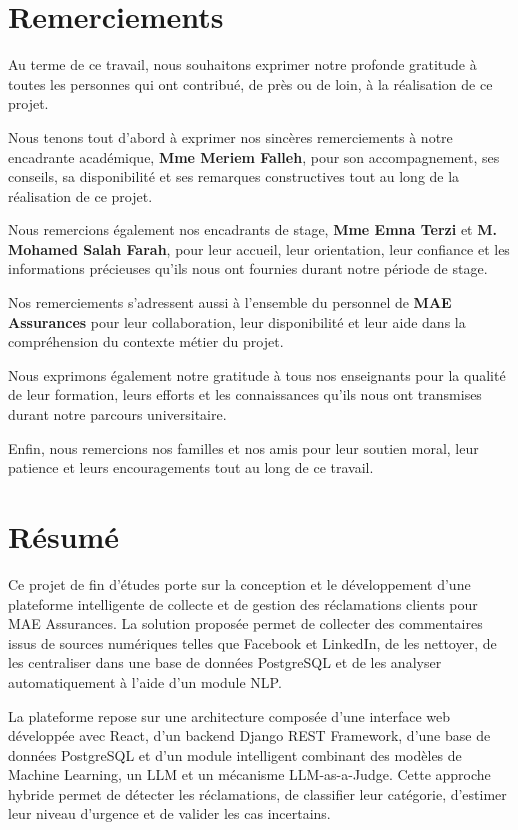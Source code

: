 \documentclass[12pt,a4paper,oneside]{report}
\begin{document}
\chapter*{Remerciements}

Au terme de ce travail, nous souhaitons exprimer notre profonde gratitude à toutes les personnes qui ont contribué, de près ou de loin, à la réalisation de ce projet.

Nous tenons tout d’abord à exprimer nos sincères remerciements à notre encadrante académique, \textbf{Mme Meriem Falleh}, pour son accompagnement, ses conseils, sa disponibilité et ses remarques constructives tout au long de la réalisation de ce projet.

Nous remercions également nos encadrants de stage, \textbf{Mme Emna Terzi} et \textbf{M. Mohamed Salah Farah}, pour leur accueil, leur orientation, leur confiance et les informations précieuses qu’ils nous ont fournies durant notre période de stage.

Nos remerciements s’adressent aussi à l’ensemble du personnel de \textbf{MAE Assurances} pour leur collaboration, leur disponibilité et leur aide dans la compréhension du contexte métier du projet.

Nous exprimons également notre gratitude à tous nos enseignants pour la qualité de leur formation, leurs efforts et les connaissances qu’ils nous ont transmises durant notre parcours universitaire.

Enfin, nous remercions nos familles et nos amis pour leur soutien moral, leur patience et leurs encouragements tout au long de ce travail.



\clearpage

\chapter*{Résumé}
Ce projet de fin d’études porte sur la conception et le développement d’une plateforme intelligente de collecte et de gestion des réclamations clients pour MAE Assurances. La solution proposée permet de collecter des commentaires issus de sources numériques telles que Facebook et LinkedIn, de les nettoyer, de les centraliser dans une base de données PostgreSQL et de les analyser automatiquement à l’aide d’un module NLP.

La plateforme repose sur une architecture composée d’une interface web développée avec React, d’un backend Django REST Framework, d’une base de données PostgreSQL et d’un module intelligent combinant des modèles de Machine Learning, un LLM et un mécanisme LLM-as-a-Judge. Cette approche hybride permet de détecter les réclamations, de classifier leur catégorie, d’estimer leur niveau d’urgence et de valider les cas incertains.
\end{document}
